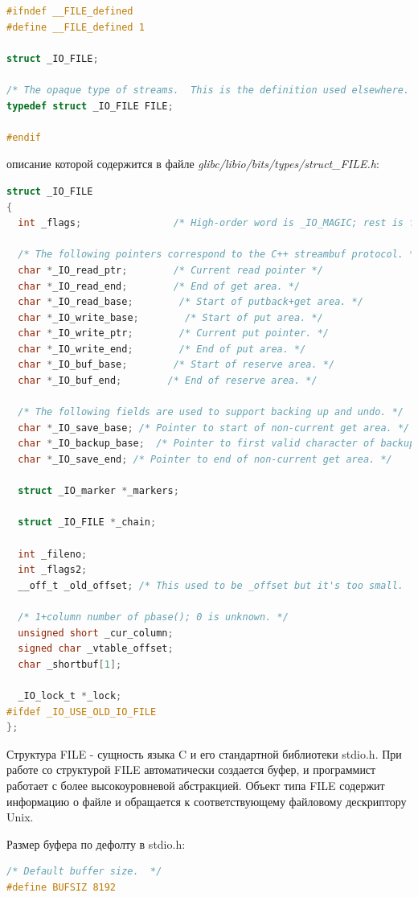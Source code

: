 \documentclass[12pt]{report}
\begin{document}
\begin{lstlisting}[language=C]
#ifndef __FILE_defined
#define __FILE_defined 1
	
struct _IO_FILE;
	
/* The opaque type of streams.  This is the definition used elsewhere.  */
typedef struct _IO_FILE FILE;
	
#endif	
\end{lstlisting}
описание которой содержится в файле \textit{glibc/libio/bits/types/struct\_FILE.h}:
\begin{lstlisting}[language=C]
struct _IO_FILE
{
  int _flags;                /* High-order word is _IO_MAGIC; rest is flags. */
 
  /* The following pointers correspond to the C++ streambuf protocol. */
  char *_IO_read_ptr;        /* Current read pointer */
  char *_IO_read_end;        /* End of get area. */
  char *_IO_read_base;        /* Start of putback+get area. */
  char *_IO_write_base;        /* Start of put area. */
  char *_IO_write_ptr;        /* Current put pointer. */
  char *_IO_write_end;        /* End of put area. */
  char *_IO_buf_base;        /* Start of reserve area. */
  char *_IO_buf_end;        /* End of reserve area. */
 
  /* The following fields are used to support backing up and undo. */
  char *_IO_save_base; /* Pointer to start of non-current get area. */
  char *_IO_backup_base;  /* Pointer to first valid character of backup area */
  char *_IO_save_end; /* Pointer to end of non-current get area. */
 
  struct _IO_marker *_markers;
 
  struct _IO_FILE *_chain;
 
  int _fileno;
  int _flags2;
  __off_t _old_offset; /* This used to be _offset but it's too small.  */
 
  /* 1+column number of pbase(); 0 is unknown. */
  unsigned short _cur_column;
  signed char _vtable_offset;
  char _shortbuf[1];
 
  _IO_lock_t *_lock;
#ifdef _IO_USE_OLD_IO_FILE
};	
\end{lstlisting}

Структура FILE - сущность языка C и его стандартной библиотеки stdio.h. При работе со структурой FILE автоматически создается буфер, и программист работает с более высокоуровневой абстракцией. Объект типа FILE содержит информацию о файле и  обращается к соответствующему файловому дескриптору Unix. 

Размер буфера по дефолту в stdio.h:
\begin{lstlisting}[language=C]
/* Default buffer size.  */
#define BUFSIZ 8192	
\end{lstlisting}
\end{document}
